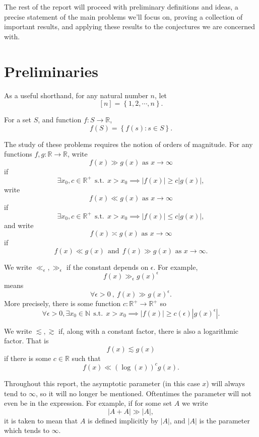 \documentclass[12pt,reqno]{amsart}
\begin{document}
The rest of the report will proceed with preliminary definitions and ideas,
a precise statement of the main problems we'll focus on, proving a collection
of important results, and applying these results to the conjectures we are concerned with.

\section{Preliminaries}

As a useful shorthand, for any natural number \(n\), let
\[
    [n] = \left\{ 1, 2 , \cdots , n \right\} 
.\]

For a set \(S\), and function \(f : S \to \mathbb{R} \),
\[
    f(S) = \left\{ f(s) : s \in S\right\} 
.\]

The study of these problems requires the notion of orders of magnitude.
For any functions \(f,g: \mathbb{R}   \to \mathbb{R} \), write
\[
    f(x) \gg g(x) \text{ as } x \to \infty 
\]
if
\[
    \exists x_0,c \in \mathbb{R} ^{+}~~\text{s.t.}~~ x > x_0 \implies \left\lvert f(x) \right\rvert \geq c \left\lvert g(x) \right\rvert  
,\]
write
\[
    f(x) \ll g(x) \text{ as } x \to \infty 
\]
if
\[
     \exists x_0,c \in \mathbb{R} ^{+}~~\text{s.t.}~~ x > x_0 \implies \left\lvert f(x) \right\rvert \leq c \left\lvert g(x) \right\rvert 
,\]
and write
\[
    f(x) \asymp g(x) \text{ as } x \to \infty 
\]
if
\[
    f(x) \ll g(x)  ~ ~ \text{and} ~ ~ f(x) \gg g(x) \text{ as } x \to \infty 
.\]

We write \(\ll _{\epsilon},\gg _{\epsilon} \) if the constant depends on \(\epsilon\). For example,
\[
    f(x) \gg _{\epsilon} g(x) ^{ \epsilon}
\]
means
\[
   \forall \epsilon> 0~,~ f(x) \gg g(x) ^{\epsilon}
.\]
More precisely, there is some function \(c : \mathbb{R} ^{+ }\to \mathbb{R} ^{+}\) so
\[
    \forall \epsilon > 0, \exists x_0\in \mathbb{N} ~~\text{s.t.}~~ x > x_0 \implies \left\lvert f(x) \right\rvert \geq c (\epsilon)\left\lvert g(x) ^{\epsilon} \right\rvert
.\]

We write \(\lesssim , \gtrsim \) if, along with a constant factor, there is also a logarithmic factor.
That is
\[
    f(x) \lesssim  g(x)
\]
if there is some \(c \in \mathbb{R} \) such that
\[
    f(x) \ll \left( \log \left( x \right)  \right) ^{c} g(x)
.\]

Throughout this report, the asymptotic parameter (in this case \(x\)) will always tend to \(\infty \),
so it will no longer be mentioned.
Oftentimes the parameter will not even be in the expression. For example,
if for some set \(A\) we write
\[
    \left\lvert A + A \right\rvert \gg \left\lvert A \right\rvert 
,\]
it is taken to mean that \(A\) is defined implicitly by \(\left\lvert A \right\rvert \), and
\(\left\lvert A \right\rvert \) is the parameter which tends to \(\infty \).
\end{document}
